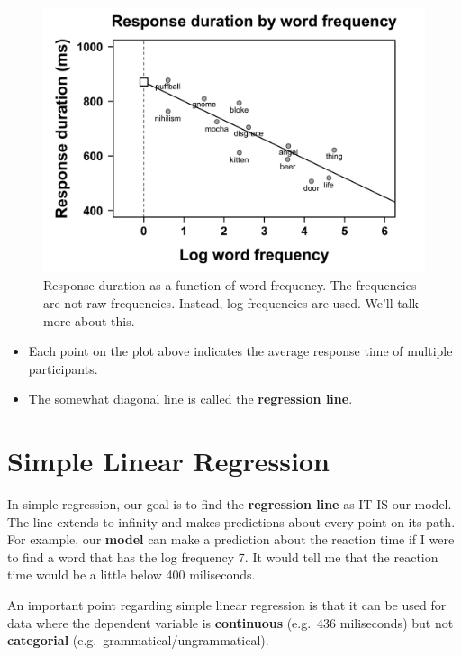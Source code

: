 \documentclass[
]{book}
\providecommand{\tightlist}{%
  \setlength{\itemsep}{0pt}\setlength{\parskip}{0pt}}
\begin{document}
\begin{figure}
\centering
\includegraphics{./img/lr/lr1.png}
\caption{\label{fig:linearregression1}Response duration as a function of word frequency. The frequencies are not raw frequencies. Instead, log frequencies are used. We'll talk more about this.}
\end{figure}

\begin{itemize}
\tightlist
\item
  Each point on the plot above indicates the average response time of multiple participants.
\item
  The somewhat diagonal line is called the \textbf{regression line}.
\end{itemize}

\hypertarget{simple-linear-regression}{%
\section{Simple Linear Regression}\label{simple-linear-regression}}

In simple regression, our goal is to find the \textbf{regression line} as IT IS our model. The line extends to infinity and makes predictions about every point on its path. For example, our \textbf{model} can make a prediction about the reaction time if I were to find a word that has the log frequency 7. It would tell me that the reaction time would be a little below 400 miliseconds.

An important point regarding simple linear regression is that it can be used for data where the dependent variable is \textbf{continuous} (e.g.~436 miliseconds) but not \textbf{categorial} (e.g.~grammatical/ungrammatical).
\end{document}
